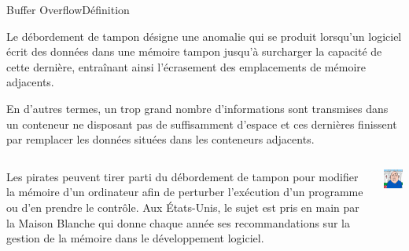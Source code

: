 \documentclass{beamer}
\begin{document}
    \begin{frame}{Buffer Overflow}{Définition}
        \begin{footnotesize}
            Le débordement de tampon désigne une anomalie qui se produit lorsqu'un logiciel écrit des données dans une mémoire tampon jusqu'à surcharger la capacité de cette dernière, entraînant ainsi l'écrasement des emplacements de mémoire adjacents.

            En d'autres termes, un trop grand nombre d'informations sont transmises dans un conteneur ne disposant pas de suffisamment d'espace et ces dernières finissent par remplacer les données situées dans les conteneurs adjacents.
            \begin{columns}
                \begin{column}{0.7\textwidth}
                    Les pirates peuvent tirer parti du débordement de tampon pour modifier la mémoire d'un ordinateur afin de perturber l'exécution d'un programme ou d'en prendre le contrôle\footnotemark.
                    \bigbreak
                    Aux États-Unis, le sujet est pris en main par la Maison Blanche qui donne chaque année ses recommandations sur la gestion de la mémoire dans le développement logiciel\footnotemark.
                \end{column}
                \begin{column}{0.3\textwidth}
                    \includegraphics[width=3cm]{image/old-senile-at-white-house}
                \end{column}
            \end{columns}
        \end{footnotesize}
    \end{frame}
\end{document}
